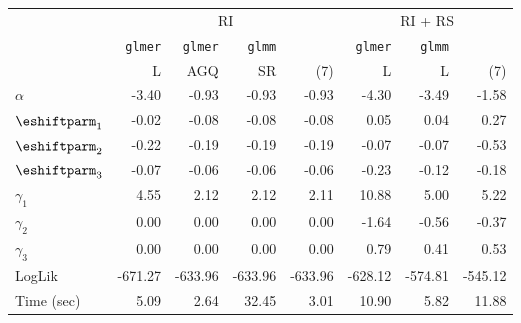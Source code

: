 
\begin{tabular}{lrrrr|rrr} \\ \hline
& \multicolumn{4}{c|}{RI} & \multicolumn{3}{c}{RI + RS} \\
& \texttt{glmer} & \texttt{glmer} & \texttt{glmm} &  & \texttt{glmer} & \texttt{glmm} & \\
& L               & AGQ             & SR & (7) & L & L & (7) \\ \hline
$\alpha$ & -3.40 & -0.93 & -0.93 & -0.93 & -4.30 & -3.49 & -1.58
\\
$\eshiftparm_1$ & -0.02 & -0.08 & -0.08 & -0.08 &  0.05 &  0.04 &  0.27
\\
$\eshiftparm_2$ & -0.22 & -0.19 & -0.19 & -0.19 & -0.07 & -0.07 & -0.53
\\
$\eshiftparm_3$ & -0.07 & -0.06 & -0.06 & -0.06 & -0.23 & -0.12 & -0.18
\\
$\gamma_1$ &  4.55 &  2.12 &  2.12 &  2.11 & 10.88 &  5.00 &  5.22
\\
$\gamma_2$ &  0.00 &  0.00 &  0.00 &  0.00 & -1.64 & -0.56 & -0.37
\\
$\gamma_3$ &  0.00 &  0.00 &  0.00 &  0.00 &  0.79 &  0.41 &  0.53
\\
\hline
LogLik & -671.27&-633.96&-633.96&-633.96&-628.12&-574.81&-545.12 \\ 
Time (sec)   &  5.09& 2.64&32.45& 3.01&10.90& 5.82&11.88 \\ \hline
\end{tabular}
